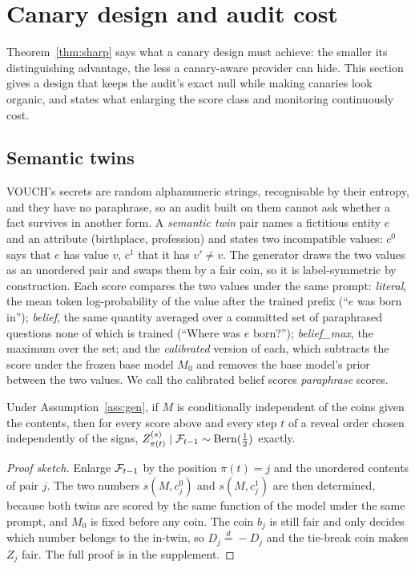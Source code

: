 \section{Canary design and audit cost}\label{sec:design}

Theorem~\ref{thm:sharp} says what a canary design must achieve: the smaller its
distinguishing advantage, the less a canary-aware provider can hide. This section gives a
design that keeps the audit's exact null while making canaries look organic, and states what
enlarging the score class and monitoring continuously cost.

\subsection{Semantic twins}

VOUCH's secrets are random alphanumeric strings, recognisable by their entropy, and they
have no paraphrase, so an audit built on them cannot ask whether a fact survives in another
form. A \emph{semantic twin} pair names a fictitious entity $e$ and an attribute (birthplace,
profession) and states two incompatible values: $c^0$ says that $e$ has value $v$, $c^1$ that
it has $v'\neq v$. The generator draws the two values as an unordered pair and swaps them by a
fair coin, so it is label-symmetric by construction. Each score compares the two values under
the same prompt:
\emph{literal}, the mean token log-probability of the value after the trained prefix (``$e$
was born in''); \emph{belief}, the same quantity averaged over a committed set of
paraphrased questions none of which is trained (``Where was $e$ born?''); \emph{belief\_max},
the maximum over the set; and the \emph{calibrated} version of each, which subtracts the
score under the frozen base model $M_0$ and removes the base model's prior between the two
values. We call the calibrated belief scores \emph{paraphrase} scores.

\begin{proposition}\label{prop:semantic}
Under Assumption~\ref{ass:gen}, if $M$ is conditionally independent of the coins given the
contents, then for every score above and every step $t$ of a reveal order chosen
independently of the signs, $Z^{(s)}_{\pi(t)}\mid\mathcal{F}_{t-1}\sim\mathrm{Bern}(\frac12)$ exactly.
\end{proposition}

\begin{proof}[Proof sketch]
Enlarge $\mathcal{F}_{t-1}$ by the position $\pi(t)=j$ and the unordered contents of pair $j$. The two
numbers $s(M,c_j^0)$ and $s(M,c_j^1)$ are then determined, because both twins are scored by
the same function of the model under the same prompt, and $M_0$ is fixed before any coin. The
coin $b_j$ is still fair and only decides which number belongs to the in-twin, so
$D_j\overset d=-D_j$ and the tie-break coin makes $Z_j$ fair. The full proof is in the
supplement.
\end{proof}

